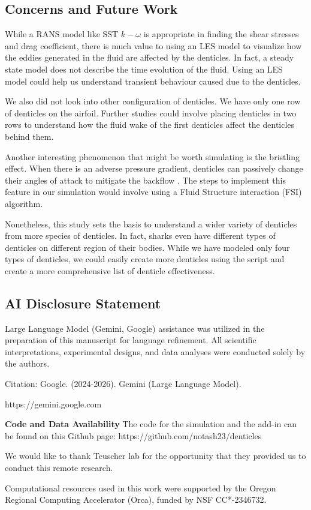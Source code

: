 \documentclass[graybox]{svmult}
\begin{document}
\subsection{Concerns and Future Work}

While a RANS model like SST $k-\omega$  is appropriate in finding the shear stresses and drag coefficient, there is much value to using an LES model to visualize how the eddies generated in the fluid are affected by the denticles. In fact, a steady state model does not describe the time evolution of the fluid. Using an LES model could help us understand transient behaviour caused due to the denticles.

We also did not look into other configuration of denticles. We have only one row of denticles on the airfoil. Further studies could involve placing denticles in two rows to understand how the fluid wake of the first denticles affect the denticles behind them.

Another interesting phenomenon that might be worth simulating is the bristling effect. When there is an adverse pressure gradient, denticles can passively change their angles of attack to mitigate the backflow \cite{du_clos_passive_2018}. The steps to implement this feature in our simulation would involve using a Fluid Structure interaction (FSI) algorithm.

Nonetheless, this study sets the basis to understand a wider variety of denticles from more species of denticles. In fact, sharks even have different types of denticles on different region of their bodies. While we have modeled only four types of denticles, we could easily create more denticles using the script and create a more comprehensive list of denticle effectiveness. 


\subsection{AI Disclosure Statement}

Large Language Model (Gemini, Google) assistance was utilized in
the preparation of this manuscript for language refinement. All scientific interpretations, experimental designs, and data analyses were conducted solely by the authors.

Citation: Google. (2024-2026). Gemini (Large Language Model).

https://gemini.google.com

\vspace{\baselineskip}
\textbf{Code and Data Availability} The code for the simulation and the add-in can be found on this Github page: https://github.com/notash23/denticles


\begin{acknowledgement}
We would like to thank Teuscher lab for the opportunity that they provided us to conduct this remote research.

Computational resources used in this work were supported by the Oregon Regional Computing Accelerator (Orca), funded by NSF CC*-2346732.
\end{acknowledgement}


 

\end{document}
